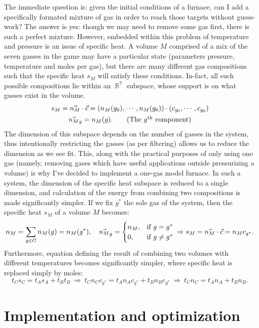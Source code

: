 \documentclass{article}
\DeclareMathOperator{\R}{\mathbb{R}}
\begin{document}
The immediate question is: given the initial conditions of a furnace,
can I add a specifically formated mixture of gas in order to reach those
targets without guess-work? The answer is yes: though we may need to remove
some gas first, there is such a perfect mixture.
However, embedded within this problem of temperature and pressure is
an issue of specific heat. A volume $M$ comprised of a mix of the seven
gasses in the game may have a particular state (parameters pressure, temperature
and moles per gas), but there are many different gas compositions such that
the specific heat $s_M$ will satisfy these conditions.
In-fact, all such possible compositions lie within an $\R^7$ subspace, whose
support is on what gasses exist in the volume.
\begin{gather*}
    s_M
    = \vec{n_M}\cdot\vec c
    = (n_M(g_0),\cdots,n_M(g_6))\cdot(c_{g_0},\cdots,c_{g_6}) \\
    \vec{n_M}_g = n_M(g). \tag{\text{The $g^{\textrm{th}}$ component}}
\end{gather*}
The dimension of this subspace depends on the number of gasses in the system,
thus intentionally restricting the gasses (as per filtering) allows us to reduce
the dimension as we see fit.
This, along with the practical purposes of only using one gas (namely, removing
gases which have useful applications outside pressurizing a volume)
is why I've decided to implement a one-gas model furnace.
In such a system, the dimension of the specific heat subspace is reduced to
a single dimension, and calculation of the energy from combining two
compositions is made significantly simpler.
If we fix $g^\ast$ the sole gas of the system, then
the specific heat $s_M$ of a volume $M$ becomes:
\[
    n_M = \sum_{g\in G}n_M(g) = n_M(g^\ast),\quad
    \vec{n_M}_g = \begin{cases}
        n_M, & \text{if }g=g^\ast \\
        0, &\text{if }g\ne g^\ast
    \end{cases}\\
    \Rightarrow
    s_M
    = \vec{n_M}\cdot\vec{c}
    = n_M c_{g^\ast}.
\]
Furthermore, equation defining the result of combining two volumes with
different temperatures becomes significantly simpler, where specific heat
is replaced simply by moles:
\[
    t_C s_C = t_A s_A+t_B t_B\
    \Rightarrow\
    t_C n_C c_{g^\ast} = t_A n_A c_{g^\ast}+t_B n_B c_{g^\ast}\
    \Rightarrow\
    t_C n_C = t_A n_A+t_B n_B.
\]

\section{Implementation and optimization}
\end{document}
